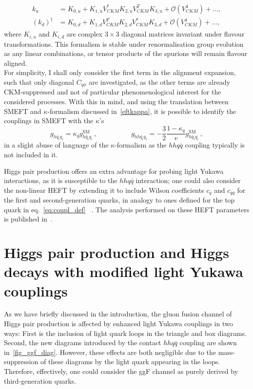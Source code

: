 \begin{align}
	k_u &= K_{0,u}+ K_{1,u} V^*_{CKM} K_{2,u} V^T_{CKM} K_{3,u} + \mathcal O(V^4_{CKM})+ \dots,  \\
	(k_d)^\dagger&=K_{0,d}+ K_{1,d} V^T_{CKM} K_{2,d} V^*_{CKM} K_{3,d} + \mathcal O(V^4_{CKM}) + \dots,
	\label{eqK}
\end{align}
where $K_{i,u}$ and $K_{i,d}$ are complex $3\times3$ diagonal matrices invariant under flavour transformations. This formalism is stable under renormalisation group evolution as any linear combinations, or tensor products of the spurions will remain flavour aligned. \\
For simplicity, I shall only consider the first term in the alignment expansion, such that only diagonal $C_{q\phi}$ are investigated, as the other terms are already CKM-suppressed and not of particular phenomenological interest for the considered processes.  With this in mind, and using the translation between SMEFT and $\kappa$-formalism discussed in~\autoref{eftkappa}, it is possible to identify the couplings in SMEFT with the $\kappa$'s
\begin{equation}
	g_{h\bar{q}_i q_i} =\kappa_q g_{h\bar{q}_i q_i}^{\text{SM}} \,, \quad \quad \quad \quad \quad g_{h h\bar{q}_i q_i}= - \frac{3}{2}\frac{1-\kappa_q}{v}g_{h\bar{q}_i q_i}^{\text{SM}} \,,
	\label{eq:def_kappa}
\end{equation}
in a slight abuse of language of the $\kappa$-formalism as the $hhq \bar q$ coupling typically is not included in it.
\par
Higgs pair production offers an extra advantage for probing light Yukawa interactions, as it is susceptible to the $hh q\bar q$ interaction; one could also consider the non-linear HEFT by extending it to include Wilson coefficients $c_q$ and $c_{qq}$ for the first and second-generation quarks, in analogy to ones defined for the top quark in eq.~\eqref{eq:coupl_def}~ \cite{Contino:2010mh}. The analysis performed on these HEFT parameters is published in~\cite{Alasfar:2019pmn}. 
\section{Higgs pair production and Higgs decays with modified light Yukawa couplings \label{sec:qqHH}}
\par As we have briefly discussed in the introduction, the gluon fusion channel of Higgs pair production is affected by enhanced light Yukawa couplings in two ways: First is the inclusion of light quark loops in the triangle and box diagrams. Second, the new diagrams introduced by the contact $hh q\bar q$ coupling are shown in~\autoref{fig_ggf_diag}. However, these effects are both negligible due to the mass-suppression of these diagrams by the light quark appearing in the loops. Therefore, effectively, one could consider the ggF channel as purely derived by third-generation quarks.
